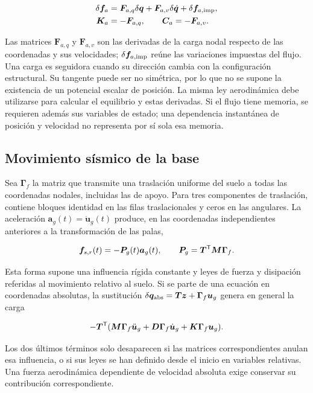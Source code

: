 \begin{align}
\delta\bm f_a&=\bm F_{a,q}\delta\bm q+\bm F_{a,v}\delta\dot{\bm q}
+\delta\bm f_{a,\rm imp},\nonumber\\
\bm K_a&=-\bm F_{a,q},\qquad \bm C_a=-\bm F_{a,v}.
\end{align}

Las matrices $\bm F_{a,q}$ y $\bm F_{a,v}$ son las derivadas de la carga nodal respecto de las coordenadas y sus velocidades; $\delta\bm f_{a,\rm imp}$ reúne las variaciones impuestas del flujo. Una carga es seguidora cuando su dirección cambia con la configuración estructural. Su tangente puede ser no simétrica, por lo que no se supone la existencia de un potencial escalar de posición. La misma ley aerodinámica debe utilizarse para calcular el equilibrio y estas derivadas. Si el flujo tiene memoria, se requieren además sus variables de estado; una dependencia instantánea de posición y velocidad no representa por sí sola esa memoria.

\subsection{Movimiento sísmico de la base}
Sea $\bm\Gamma_f$ la matriz que transmite una traslación uniforme del suelo a todas las coordenadas nodales, incluidas las de apoyo. Para tres componentes de traslación, contiene bloques identidad en las filas traslacionales y ceros en las angulares. La aceleración $\bm a_g(t)=\ddot{\bm u}_g(t)$ produce, en las coordenadas independientes anteriores a la transformación de las palas,

\begin{equation}
\bm f_{s,r}(t)=-\bm P_g(t)\bm a_g(t),\qquad
\bm P_g=\bm T^\mathsf T\bm M\bm\Gamma_f.
\label{eq:seismic}
\end{equation}

Esta forma supone una influencia rígida constante y leyes de fuerza y disipación referidas al movimiento relativo al suelo. Si se parte de una ecuación en coordenadas absolutas, la sustitución $\delta\bm q_{\rm abs}=\bm T\bm z+\bm\Gamma_f\bm u_g$ genera en general la carga

\begin{equation}
-\bm T^\mathsf T(\bm M\bm\Gamma_f\ddot{\bm u}_g
+\bm D\bm\Gamma_f\dot{\bm u}_g+\bm K\bm\Gamma_f\bm u_g).
\end{equation}

Los dos últimos términos solo desaparecen si las matrices correspondientes anulan esa influencia, o si sus leyes se han definido desde el inicio en variables relativas. Una fuerza aerodinámica dependiente de velocidad absoluta exige conservar su contribución correspondiente.

